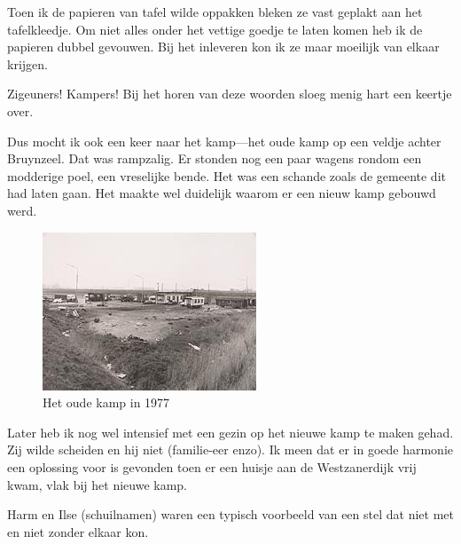 \documentclass[12pt,twoside, openright]{memoir}
\begin{document}

Toen ik de papieren van tafel wilde oppakken bleken ze vast geplakt aan het tafelkleedje. Om niet alles onder het vettige goedje te laten komen heb ik de papieren dubbel gevouwen. Bij het inleveren kon ik ze maar moeilijk van elkaar krijgen.	

Zigeuners! Kampers! Bij het horen van deze woorden sloeg menig hart een keertje over. 

Dus mocht ik ook een keer naar het kamp---het oude kamp op een veldje achter Bruynzeel. Dat was rampzalig. Er stonden nog een paar wagens rondom een modderige poel, een vreselijke bende. Het was een schande zoals de gemeente dit had laten gaan. Het maakte wel duidelijk waarom er een nieuw kamp gebouwd werd. 

\begin{figure}
\centering
\includegraphics[width=\textwidth]{img/ch42/woonwagenkamp1977}
\caption*{\footnotesize Het oude kamp in 1977}
\end{figure}

Later heb ik nog wel intensief met een gezin op het nieuwe kamp te maken gehad. Zij wilde scheiden en hij niet (familie-eer enzo). Ik meen dat er in goede harmonie een oplossing voor is gevonden toen er een huisje aan de Westzanerdijk vrij kwam, vlak bij het nieuwe kamp. 

Harm en Ilse (schuilnamen) waren een typisch voorbeeld van een stel dat niet met en niet zonder elkaar kon. 
\end{document}
